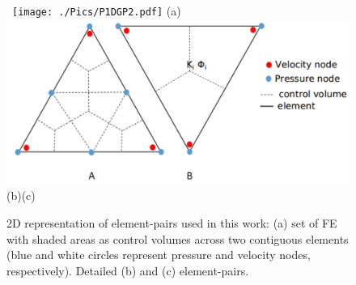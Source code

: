 
\begin{figure}[h]
\vbox{\vspace{0.cm}
\hbox{\hspace{2cm}
\texttt{[image: ./Pics/P1DGP2.pdf]}}
\vspace{0.cm}
\hbox{\hspace{5cm}(a)}
\vspace{0.5cm}
\hbox{\hspace{1cm}
\includegraphics[width=.75\textwidth]{./Pics/element_n_2b.pdf}}
\vspace{0.cm}
\hbox{\hspace{3.5cm}(b)\hspace{3cm}(c)}}
\caption{2D representation of  element-pairs used in this work: (a) set of  FE with shaded areas as control volumes across two contiguous elements (blue and white circles represent pressure and velocity nodes, respectively). Detailed (b)  and (c)  element-pairs.} 
\label{fig:fem_elem}
\end{figure}
\clearpage





